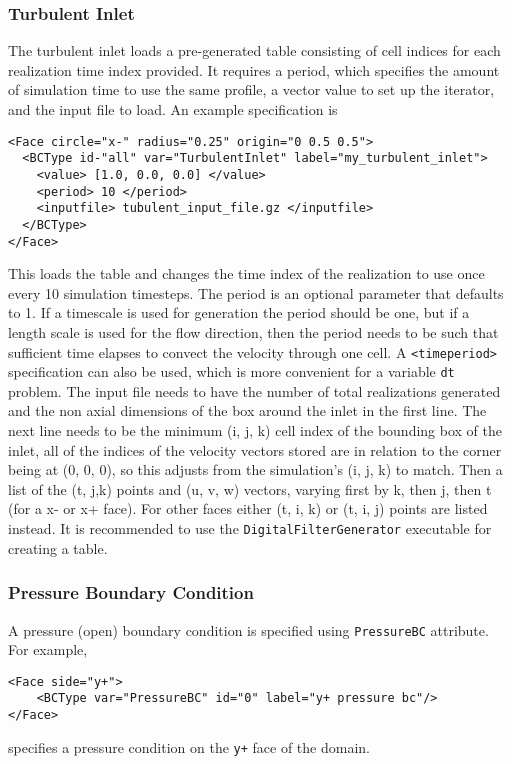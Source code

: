 \subsubsection*{Turbulent Inlet} \label{subsubsec:TurbInlet}
%
The turbulent inlet loads a pre-generated table consisting of cell indices for each realization time index provided.  It requires a period, which specifies the amount of simulation time to use the same profile, a vector value to set up the iterator, and the input file to load.  An example specification is
%
\begin{Verbatim}[fontsize=\footnotesize]
<Face circle="x-" radius="0.25" origin="0 0.5 0.5">
  <BCType id-"all" var="TurbulentInlet" label="my_turbulent_inlet">
    <value> [1.0, 0.0, 0.0] </value>
    <period> 10 </period>
    <inputfile> tubulent_input_file.gz </inputfile>
  </BCType>    
</Face>
\end{Verbatim}
%
This loads the table and changes the time index of the realization to use once every 10 simulation timesteps.  The period is an optional parameter that defaults to 1. If a timescale is used for generation the period should be one, but if a length scale is used for the flow direction, then the period needs to be such that sufficient time elapses to convect the velocity through one cell.  A \verb=<timeperiod>= specification can also be used, which is more convenient for a variable \verb=dt= problem. The input file needs to have the number of total realizations generated and the non axial dimensions of the box around the inlet in the first line.  The next line needs to be the minimum (i, j, k) cell index of the bounding box of the inlet, all of the indices of the velocity vectors stored are in relation to the corner being at (0, 0, 0), so this adjusts from the simulation's (i, j, k) to match.  Then a list of the (t, j,k) points and (u, v, w) vectors, varying first by k, then j, then t (for a x- or x+ face).  For other faces either (t, i, k) or (t, i, j) points are listed instead.  It is recommended to use the \verb=DigitalFilterGenerator= executable for creating a table.

\subsubsection*{Pressure Boundary Condition}
%
A pressure (open) boundary condition is specified using \verb=PressureBC= attribute.  For example, 
%
\begin{Verbatim}[fontsize=\footnotesize]
<Face side="y+">
	<BCType var="PressureBC" id="0" label="y+ pressure bc"/>
</Face>
\end{Verbatim}
%
specifies a pressure condition on the \verb=y+= face of the domain. 
%

